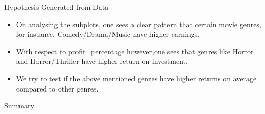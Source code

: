 \documentclass{beamer}
\begin{document}
\begin{frame}{Hypothesis Generated from Data}

\begin{itemize}
\item On analysing the subplots, one sees a clear pattern that certain movie genres, for instance, Comedy/Drama/Music  have higher earnings.
\item With respect to profit\_percentage however,one sees that genres like Horror and Horror/Thriller have higher return on investment.
\item We try to test if the above mentioned genres have higher returns on average compared to other genres. 

\end{itemize}
%
%
\end{frame}
\begin{frame}{Summary}

\end{frame}
\begin{frame}
\printbibliography

\end{frame}
\end{document}
